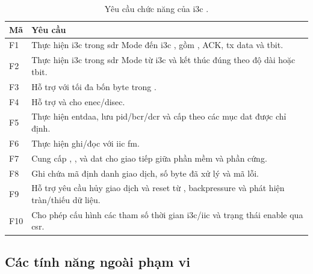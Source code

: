 \begin{table}[!htbp]
	\centering
	\caption{Yêu cầu chức năng của \gls{i3c} \Controller{}.}
	\label{tab:req-func}
	\begin{tabular}{C{1.4cm} L{11.8cm}}
		\toprule
		\textbf{Mã} & \textbf{Yêu cầu}                                                                                                                          \\
		\midrule
		F1          & Thực hiện \gls{i3c} \PrivateWrite{} trong \gls{sdr} Mode đến \gls{i3c} \Target{}, gồm \AddressHeader{}, ACK, \gls{tx} data và \gls{tbit}. \\
		F2          & Thực hiện \gls{i3c} \PrivateRead{} trong \gls{sdr} Mode từ \gls{i3c} \Target{} và kết thúc đúng theo độ dài hoặc \gls{tbit}.              \\
		F3          & Hỗ trợ \ImmediateDataTransfer{} với tối đa bốn byte trong \CommandDescriptor{}.                                                           \\
		F4          & Hỗ trợ \BroadcastCCC{} và \DirectCCC{} cho \gls{enec}/\gls{disec}.                                                                        \\
		F5          & Thực hiện \gls{entdaa}, lưu \gls{pid}/\gls{bcr}/\gls{dcr} và cấp \DynamicAddress{} theo các mục \gls{dat} được chỉ định.                  \\
		F6          & Thực hiện ghi/đọc với \gls{iic} \Target{} \gls{fm}.                                                                                       \\
		F7          & Cung cấp \CommandFifo{}, \ResponseFifo{}, \TxRxFifo{} và \gls{dat} cho giao tiếp giữa phần mềm và phần cứng.                              \\
		F8          & Ghi \ResponseDescriptor{} chứa mã định danh giao dịch, số byte đã xử lý và mã lỗi.                                                        \\
		F9          & Hỗ trợ yêu cầu hủy giao dịch và reset từ \Host{}, backpressure và phát hiện tràn/thiếu dữ liệu.                                           \\
		F10         & Cho phép cấu hình các tham số thời gian \gls{i3c}/\gls{iic} và trạng thái enable qua \gls{csr}.                                           \\
		\bottomrule
	\end{tabular}
\end{table}

\subsection{Các tính năng ngoài phạm vi}
\label{sec:req-oos}

